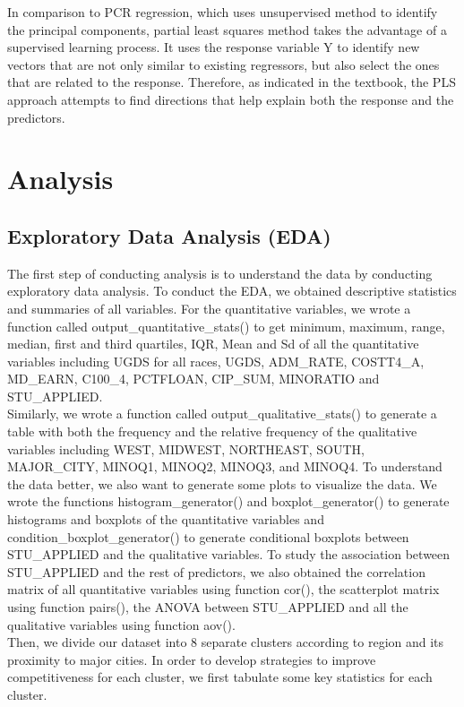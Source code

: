 \documentclass{article}
\begin{document}
In comparison to PCR regression, which uses unsupervised method to identify the principal components, partial least squares method takes the advantage of a supervised learning process. It uses the response variable Y to identify new vectors that are not only similar to existing regressors, but also select the ones that are related to the response. Therefore, as indicated in the textbook, the PLS approach attempts to find directions that help explain both the response and the predictors. 


\section{Analysis}

\subsection{Exploratory Data Analysis (EDA)}

The first step of conducting analysis is to understand the data by conducting exploratory data analysis. To conduct the EDA, we obtained descriptive statistics and summaries of all variables. For the quantitative variables, we wrote a function called output\_quantitative\_stats() to get minimum, maximum, range, median, first and third quartiles, IQR, Mean and Sd of all the quantitative variables including UGDS for all races, UGDS, ADM\_RATE, COSTT4\_A, MD\_EARN, C100\_4, PCTFLOAN, CIP\_SUM, MINORATIO and STU\_APPLIED.\\

Similarly, we wrote a function called output\_qualitative\_stats() to generate a table with both the frequency and the relative frequency of the qualitative variables including WEST,  MIDWEST, NORTHEAST, SOUTH, MAJOR\_CITY, MINOQ1, MINOQ2, MINOQ3, and MINOQ4. To understand the data better, we also want to generate some plots to visualize the data. We wrote the functions histogram\_generator() and boxplot\_generator() to generate histograms and boxplots of the quantitative variables and condition\_boxplot\_generator() to generate conditional boxplots between STU\_APPLIED and the qualitative variables. To study the association between STU\_APPLIED and the rest of predictors, we also obtained the correlation matrix of all quantitative variables using function cor(), the scatterplot matrix using function pairs(), the ANOVA between STU\_APPLIED and all the qualitative variables using function aov().\\

Then, we divide our dataset into 8 separate clusters according to region and its proximity to major cities. In order to develop strategies to improve competitiveness for each cluster, we first tabulate some key statistics for each cluster.\\
\end{document}
